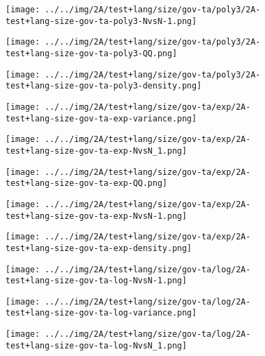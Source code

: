 \begin{figure}[H]
\centering	\texttt{[image: ../../img/2A/test+lang/size/gov-ta/poly3/2A-test+lang-size-gov-ta-poly3-NvsN-1.png]}
\end{figure}
\begin{figure}[H]
\centering	\texttt{[image: ../../img/2A/test+lang/size/gov-ta/poly3/2A-test+lang-size-gov-ta-poly3-QQ.png]}
\end{figure}
\begin{figure}[H]
\centering	\texttt{[image: ../../img/2A/test+lang/size/gov-ta/poly3/2A-test+lang-size-gov-ta-poly3-density.png]}
\end{figure}
\begin{figure}[H]
\centering	\texttt{[image: ../../img/2A/test+lang/size/gov-ta/exp/2A-test+lang-size-gov-ta-exp-variance.png]}
\end{figure}
\begin{figure}[H]
\centering	\texttt{[image: ../../img/2A/test+lang/size/gov-ta/exp/2A-test+lang-size-gov-ta-exp-NvsN\_1.png]}
\end{figure}
\begin{figure}[H]
\centering	\texttt{[image: ../../img/2A/test+lang/size/gov-ta/exp/2A-test+lang-size-gov-ta-exp-QQ.png]}
\end{figure}
\begin{figure}[H]
\centering	\texttt{[image: ../../img/2A/test+lang/size/gov-ta/exp/2A-test+lang-size-gov-ta-exp-NvsN-1.png]}
\end{figure}
\begin{figure}[H]
\centering	\texttt{[image: ../../img/2A/test+lang/size/gov-ta/exp/2A-test+lang-size-gov-ta-exp-density.png]}
\end{figure}
\begin{figure}[H]
\centering	\texttt{[image: ../../img/2A/test+lang/size/gov-ta/log/2A-test+lang-size-gov-ta-log-NvsN-1.png]}
\end{figure}
\begin{figure}[H]
\centering	\texttt{[image: ../../img/2A/test+lang/size/gov-ta/log/2A-test+lang-size-gov-ta-log-variance.png]}
\end{figure}
\begin{figure}[H]
\centering	\texttt{[image: ../../img/2A/test+lang/size/gov-ta/log/2A-test+lang-size-gov-ta-log-NvsN\_1.png]}
\end{figure}

